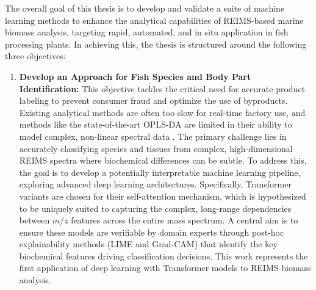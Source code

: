The overall goal of this thesis is to develop and validate a suite of machine learning methods to enhance the analytical capabilities of REIMS-based marine biomass analysis, targeting rapid, automated, and in situ application in fish processing plants. In achieving this, the thesis is structured around the following three objectives:

\begin{enumerate}
\item \textbf{Develop an Approach for Fish Species and Body Part Identification:} This objective tackles the critical need for accurate product labeling to prevent consumer fraud and optimize the use of byproducts. Existing analytical methods are often too slow for real-time factory use, and methods like the state-of-the-art OPLS-DA are limited in their ability to model complex, non-linear spectral data \citep{De2023, Cardoso2025}. The primary challenge lies in accurately classifying species and tissues from complex, high-dimensional REIMS spectra where biochemical differences can be subtle. To address this, the goal is to develop a potentially interpretable machine learning pipeline, exploring advanced deep learning architectures. Specifically, Transformer variants are chosen for their self-attention mechanism, which is hypothesized to be uniquely suited to capturing the complex, long-range dependencies between $m/z$ features across the entire mass spectrum. A central aim is to ensure these models are verifiable by domain experts through post-hoc explainability methods (LIME and Grad-CAM) that identify the key biochemical features driving classification decisions. This work represents the first application of deep learning with Transformer models to REIMS biomass analysis.


\end{enumerate}
